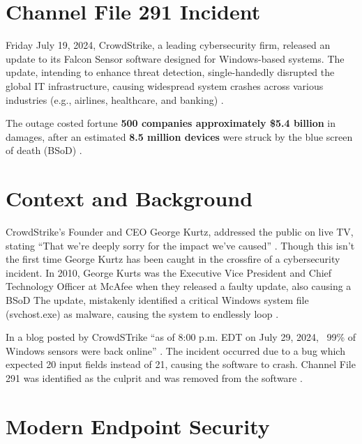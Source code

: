 

\section{Channel File 291 Incident}
\label{sec:crowd}

Friday July 19, 2024, CrowdStrike, a leading cybersecurity firm, released an update to its Falcon Sensor
software designed for Windows-based systems. The update, intending to enhance threat detection, single-handedly
disrupted the global IT infrastructure, causing widespread system crashes across various industries
(e.g., airlines, healthcare, and banking) \cite{crowdstrike2024falcon}. 

The outage costed fortune \textbf{500 companies approximately \$5.4 billion} in damages, after an 
estimated \textbf{8.5 million devices} were struck by the blue screen of death (BSoD) \cite{tidy_crowdstrike_outage_2024}\cite{kerner_crowdstrike_outage_2024}.

\section{Context and Background}
\label{sec:context}

CrowdStrike's Founder and CEO George Kurtz, addressed the public on live TV, stating ``That we're deeply sorry for the impact we've caused'' \cite{sato_crowdstrike_ceo_2024}.
Though this isn't the first time George Kurtz has been caught in the crossfire of a cybersecurity incident.
In 2010, George Kurts was the Executive Vice President and Chief Technology Officer at McAfee when they released a faulty update, also causing a BSoD
The update, mistakenly identified a critical Windows system file (svchost.exe) as malware, causing the system to endlessly loop \cite{volenik_crowdstrike_ceo_2024}.

In a blog posted by CrowdSTrike ``as of 8:00 p.m. EDT on July 29, 2024, ~99\% of Windows sensors were back online'' \cite{crowdstrike_channel_file_291_2024}.
The incident occurred due to a bug which expected 20 input fields instead of 21, causing the software to crash. Channel File 291 was identified as the 
culprit and was removed from the software \cite{crowdstrike_channel_file_291_2024}.

\section{Modern Endpoint Security}
\label{sec:falcon}

